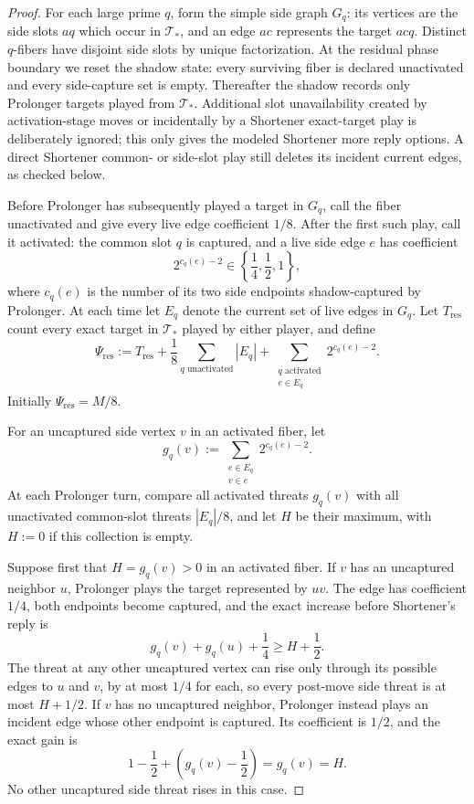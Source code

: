 \begin{proof}
For each large prime $q$, form the simple side graph $G_q$: its vertices are
the side slots $aq$ which occur in $\mathcal T_*$, and an edge $ac$ represents
the target $acq$.  Distinct $q$-fibers have disjoint side slots by unique
factorization.  At the residual phase boundary we reset the shadow state:
every surviving fiber is declared unactivated and every side-capture set is
empty.  Thereafter the shadow records only Prolonger targets played from
$\mathcal T_*$.  Additional slot unavailability created by activation-stage
moves or incidentally by a Shortener exact-target play is deliberately ignored;
this only gives the modeled Shortener more reply options.  A direct Shortener
common- or side-slot play still deletes its incident current edges, as checked
below.

Before Prolonger has subsequently played a target in $G_q$, call the fiber
unactivated and
give every live edge coefficient $1/8$.  After the first such play, call it
activated: the common slot $q$ is captured, and a live side edge $e$ has
coefficient
\[
  2^{c_q(e)-2}\in\left\{\frac14,\frac12,1\right\},
\]
where $c_q(e)$ is the number of its two side endpoints shadow-captured by
Prolonger.  At each time let $E_q$ denote the current set of live edges in
$G_q$.  Let $T_{\mathrm{res}}$ count every exact target in
$\mathcal T_*$ played by either player, and define
\[
  \Psi_{\mathrm{res}}
  :=
  T_{\mathrm{res}}
  +\frac18\sum_{q\text{ unactivated}}|E_q|
  +\sum_{\substack{q\text{ activated}\\e\in E_q}}
     2^{c_q(e)-2}.
\]
Initially $\Psi_{\mathrm{res}}=M/8$.

For an uncaptured side vertex $v$ in an activated fiber, let
\[
  g_q(v):=
  \sum_{\substack{e\in E_q\\v\in e}}2^{c_q(e)-2}.
\]
At each Prolonger turn, compare all activated threats $g_q(v)$ with all
unactivated common-slot threats $|E_q|/8$, and let $H$ be their maximum, with
$H:=0$ if this collection is empty.

Suppose first that $H=g_q(v)>0$ in an activated fiber.  If $v$ has an
uncaptured neighbor $u$, Prolonger plays the target represented by $uv$.  The
edge has coefficient $1/4$, both endpoints become captured, and the exact
increase before Shortener's reply is
\[
  g_q(v)+g_q(u)+\frac14\ge H+\frac12.
\]
The threat at any other uncaptured vertex can rise only through its possible
edges to $u$ and $v$, by at most $1/4$ for each, so every post-move side threat
is at most $H+1/2$.  If $v$ has no uncaptured neighbor, Prolonger instead plays
an incident edge whose other endpoint is captured.  Its coefficient is
$1/2$, and the exact gain is
\[
  1-\frac12+\left(g_q(v)-\frac12\right)=g_q(v)=H.
\]
No other uncaptured side threat rises in this case.


\end{proof}
